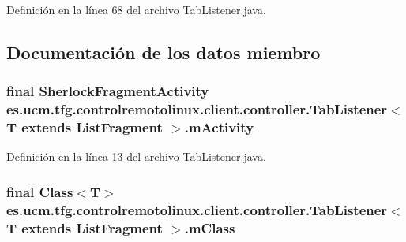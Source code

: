Definición en la línea 68 del archivo Tab\-Listener.\-java.



\subsection{Documentación de los datos miembro}
\hypertarget{classes_1_1ucm_1_1tfg_1_1controlremotolinux_1_1client_1_1controller_1_1TabListener_3_01T_01extends_01ListFragment_01_4_a736cc9d17d8f0b1a7b11d8fe086af84d}{
\subsubsection[{m\-Activity}]{\setlength{\rightskip}{0pt plus 5cm}final Sherlock\-Fragment\-Activity es.\-ucm.\-tfg.\-controlremotolinux.\-client.\-controller.\-Tab\-Listener$<$ T extends List\-Fragment $>$.m\-Activity\hspace{0.3cm}{\ttfamily [private]}}}\label{classes_1_1ucm_1_1tfg_1_1controlremotolinux_1_1client_1_1controller_1_1TabListener_3_01T_01extends_01ListFragment_01_4_a736cc9d17d8f0b1a7b11d8fe086af84d}


Definición en la línea 13 del archivo Tab\-Listener.\-java.

\hypertarget{classes_1_1ucm_1_1tfg_1_1controlremotolinux_1_1client_1_1controller_1_1TabListener_3_01T_01extends_01ListFragment_01_4_af8ec988af20112a3f63f77113323c152}{
\subsubsection[{m\-Class}]{\setlength{\rightskip}{0pt plus 5cm}final Class$<$T$>$ es.\-ucm.\-tfg.\-controlremotolinux.\-client.\-controller.\-Tab\-Listener$<$ T extends List\-Fragment $>$.m\-Class\hspace{0.3cm}{\ttfamily [private]}}}\label{classes_1_1ucm_1_1tfg_1_1controlremotolinux_1_1client_1_1controller_1_1TabListener_3_01T_01extends_01ListFragment_01_4_af8ec988af20112a3f63f77113323c152}


